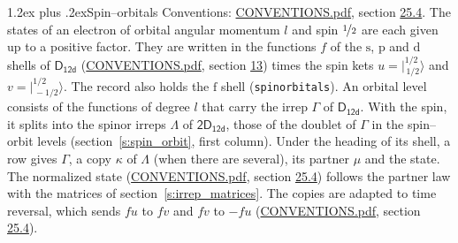 \documentclass[10pt,a4paper]{article}
\makeatletter
\renewcommand\section{\@startsection{section}{1}{\z@}{-3ex plus -1ex minus -.2ex}%
  {1.2ex plus .2ex}{\normalfont\large\sffamily\bfseries\color{parttitle}}}
\numberwithin{equation}{section}
\newcommand{\grp}[1]{\mathsf{#1}}
\newcommand{\orbital}[1]{\mathrm{#1}}
\newcommand{\mult}{\kappa}
\newcommand{\intx}{\mu}
\newcommand{\jm}[2]{\bigl\lvert{}^{#1}_{\,#2}\bigr\rangle}
\makeatother
\begin{document}
\section{Spin--orbitals}\label{s:spin_orbitals}
Conventions: \href{../../CONVENTIONS.pdf}{CONVENTIONS.pdf}, section \href{../../CONVENTIONS.pdf\#conv.25.4}{25.4}.
\leavevmode\label{n:index.orbital.l}The states of an electron of orbital angular momentum $l$ and spin $\nicefrac{1}{2}$ are each given up to a positive factor. \label{n:local.spinor.uv}\label{n:local.function.f}They are written in the functions $f$ of the $\orbital{s}$, $\orbital{p}$ and $\orbital{d}$ shells of \href{../../../rotation/data/pdf/D12d.pdf}{$\grp{D_{12d}}$} (\href{../../CONVENTIONS.pdf}{CONVENTIONS.pdf}, section \href{../../../rotation/CONVENTIONS.pdf\#conv.13}{13}) times the spin kets $u = \jm{1/2}{1/2}$ and $v = \jm{1/2}{-1/2}$. The record also holds the $\orbital{f}$ shell (\texttt{spinorbitals}). An orbital level consists of the functions of degree $l$ that carry the irrep $\Gamma$ of \href{../../../rotation/data/pdf/D12d.pdf}{$\grp{D_{12d}}$}. With the spin, it splits into the spinor irreps $\Lambda$ of $\grp{2D_{12d}}$, those of the doublet of $\Gamma$ in the spin--orbit levels (section~\ref{s:spin_orbit}, first column). \label{n:head.state}Under the heading of its shell, a row gives $\Gamma$, a copy $\mult$ of $\Lambda$ (when there are several), its partner $\intx$ and the state. The normalized state (\href{../../CONVENTIONS.pdf}{CONVENTIONS.pdf}, section \href{../../CONVENTIONS.pdf\#conv.25.4}{25.4}) follows the partner law with the matrices of section~\ref{s:irrep_matrices}. The copies are adapted to time reversal, which sends $f u$ to $f v$ and $f v$ to $-f u$ (\href{../../CONVENTIONS.pdf}{CONVENTIONS.pdf}, section \href{../../CONVENTIONS.pdf\#conv.25.4}{25.4}).
\end{document}
